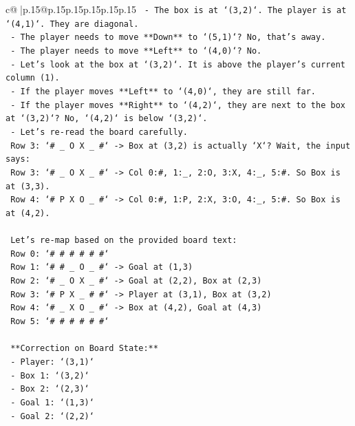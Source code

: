 \documentclass{article}
\begin{document}
{\begin{supertabular}{c@{$\;$}|p{.15\linewidth}@{}p{.15\linewidth}p{.15\linewidth}p{.15\linewidth}p{.15\linewidth}p{.15\linewidth}}
{{{\texttt{    {-} The box is at `(3,2)`. The player is at `(4,1)`. They are diagonal.} \\
\texttt{    {-} The player needs to move **Down** to `(5,1)`? No, that's away.} \\
\texttt{    {-} The player needs to move **Left** to `(4,0)`? No.} \\
\texttt{    {-} Let's look at the box at `(3,2)`. It is above the player's current column (1).} \\
\texttt{    {-} If the player moves **Left** to `(4,0)`, they are still far.} \\
\texttt{    {-} If the player moves **Right** to `(4,2)`, they are next to the box at `(3,2)`? No, `(4,2)` is below `(3,2)`.} \\
\texttt{    {-} Let's re{-}read the board carefully.} \\
\texttt{      Row 3: `\# \_ O X \_ \#` {-}> Box at (3,2) is actually `X`? Wait, the input says:} \\
\texttt{      Row 3: `\# \_ O X \_ \#` {-}> Col 0:\#, 1:\_, 2:O, 3:X, 4:\_, 5:\#. So Box is at (3,3).} \\
\texttt{      Row 4: `\# P X O \_ \#` {-}> Col 0:\#, 1:P, 2:X, 3:O, 4:\_, 5:\#. So Box is at (4,2).} \\
\\ 
\texttt{      Let's re{-}map based on the provided board text:} \\
\texttt{      Row 0: `\# \# \# \# \# \#`} \\
\texttt{      Row 1: `\# \# \_ O \_ \#` {-}> Goal at (1,3)} \\
\texttt{      Row 2: `\# \_ O X \_ \#` {-}> Goal at (2,2), Box at (2,3)} \\
\texttt{      Row 3: `\# P X \_ \# \#` {-}> Player at (3,1), Box at (3,2)} \\
\texttt{      Row 4: `\# \_ X O \_ \#` {-}> Box at (4,2), Goal at (4,3)} \\
\texttt{      Row 5: `\# \# \# \# \# \#`} \\
\\ 
\texttt{      **Correction on Board State:**} \\
\texttt{      {-} Player: `(3,1)`} \\
\texttt{      {-} Box 1: `(3,2)`} \\
\texttt{      {-} Box 2: `(2,3)`} \\
\texttt{      {-} Goal 1: `(1,3)`} \\
\texttt{      {-} Goal 2: `(2,2)`} \\
}}}
\end{supertabular}}
\end{document}
